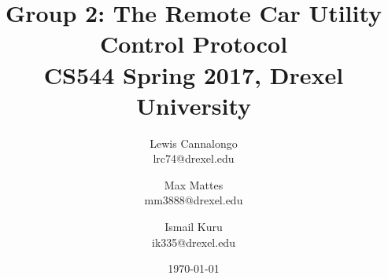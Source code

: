 \documentclass[12pt]{usenixsubmit}
\begin{document}

\title{Group 2: The Remote Car Utility Control Protocol \\ \Large{CS544 Spring 2017, Drexel University}}

\author{
    Lewis Cannalongo \\
    lrc74@drexel.edu
    \and
     Max Mattes \\
    mm3888@drexel.edu
    \and
    Ismail Kuru \\
    ik335@drexel.edu
}
\date{\today}

\maketitle

\thispagestyle{empty}



\tableofcontents
\pagebreak

\setcounter{page}{1}













%
%



%
\end{document}
